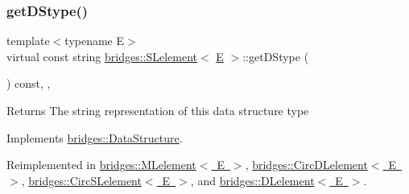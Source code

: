 \mbox{\label{classbridges_1_1_s_lelement_a136330b3481a47b3edb429f323274655}} 
\subsubsection{\texorpdfstring{getDStype()}{getDStype()}}
{\footnotesize\ttfamily template$<$typename E$>$ \\
virtual const string \mbox{\hyperlink{classbridges_1_1_s_lelement}{bridges\+::\+S\+Lelement}}$<$ \mbox{\hyperlink{namespacebridges_acfb0a4f7877d8f63de3e6862004c50eda3a3ea00cfc35332cedf6e5e9a32e94da}{E}} $>$\+::get\+D\+Stype (\begin{DoxyParamCaption}{ }\end{DoxyParamCaption}) const\hspace{0.3cm}{\ttfamily [inline]}, {\ttfamily [override]}, {\ttfamily [virtual]}}

\begin{DoxyReturn}{Returns}
The string representation of this data structure type 
\end{DoxyReturn}


Implements \mbox{\hyperlink{classbridges_1_1_data_structure_a957a63b106e340bc753620c650632bdc}{bridges\+::\+Data\+Structure}}.



Reimplemented in \mbox{\hyperlink{classbridges_1_1_m_lelement_af6e8a50c38e6481ce2c569d0174c564e}{bridges\+::\+M\+Lelement$<$ E $>$}}, \mbox{\hyperlink{classbridges_1_1_circ_d_lelement_a0e199fe681755df694807261ce2460c2}{bridges\+::\+Circ\+D\+Lelement$<$ E $>$}}, \mbox{\hyperlink{classbridges_1_1_circ_s_lelement_a4b27c205af46162371e3ffe05cbbe3d5}{bridges\+::\+Circ\+S\+Lelement$<$ E $>$}}, and \mbox{\hyperlink{classbridges_1_1_d_lelement_a109be7aba8bd3d0450859938b5d3144c}{bridges\+::\+D\+Lelement$<$ E $>$}}.

\mbox{\label{classbridges_1_1_s_lelement_abcd5b5a42ce5641e988f5e00eace7b0a}} 
